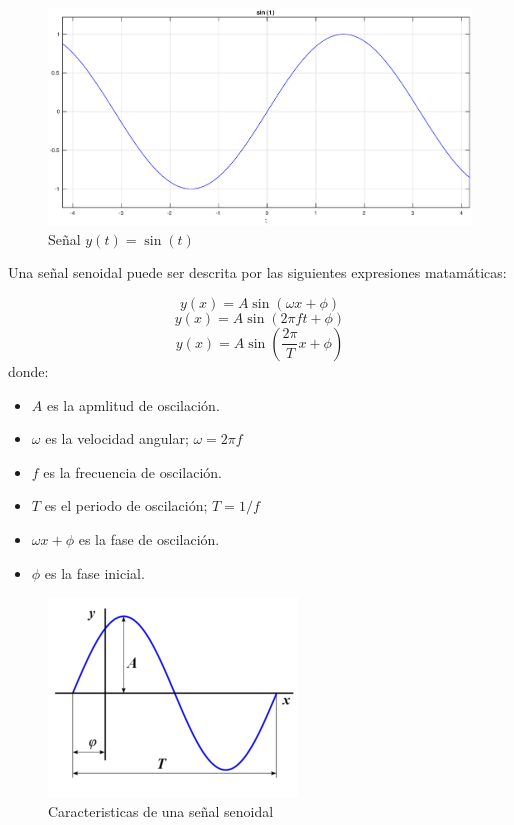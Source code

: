 \documentclass[11pt]{article}
\begin{document}
\begin{figure}[h]
\centering
\includegraphics[scale=0.3]{pics/sin.eps} 
\caption{Señal $y(t) = \sin(t)$}
\end{figure}
\newpage
Una señal senoidal puede ser descrita por las siguientes expresiones matamáticas: 

$$y(x)=A \sin(\omega x + \phi)$$
$$y(x)=A \sin(2\pi ft + \phi)$$
$$y(x)=A \sin \left(\frac{2\pi}{T}x+\phi\right)$$
donde:\\
\begin{itemize}
\item $A$ es la apmlitud de oscilación.
\item $\omega$ es la velocidad angular; $\omega=2\pi f$
\item $f$ es la frecuencia de oscilación.
\item $T$ es el periodo de oscilación; $T=1/f$
\item $\omega x + \phi$ es la fase de oscilación.
\item $\phi$ es la fase inicial.
\end{itemize}

\begin{figure}
\centering
\includegraphics[scale=0.7]{pics/sin_c.png} 
\caption{Caracteristicas de una señal senoidal}
\end{figure}
\end{document}
